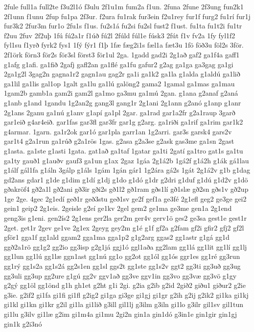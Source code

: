 {2fule
full1a
full2te
f3u2l1ó
f3ulu
2f1u1m
fum2a
f1un.
2funa
2fune
2f3ung
fun2k1
2f1unn
f1unu
2fup
fu1pa
2f3ur.
f2ura
fu1rak
fur3ein
f2u1rey
fur1f
furg2
fu1rí
fur1j
fur3k2
2fur3m
fur1o
2fu1s
f1us.
fu2s1á
fu2si
fu2sl
fust2
f1ust.
fu1ta
fu1t2i
fu1tr
f2uu
2fuv
2f2uþ
1fú
fú2a1r
f1úð
fú2l
2fúld
fúl1e
fúsk3
2fút
f1v
fv2a
1fy
fyl1f2
fyl1su
f1yrð
fyrk2
fys1
1fý
fýr1
f1þ
1fæ
fæg2i1s
fæl1a
fæt3u
1fö
föð3u
föl2s
3för.
2f1örk
förn3
för2s
för3sl
först3
för1ul
2ga.
1gadd
gad2i
2g1að
gaf2
ga1f4a
gaff1
g1afg
g1afi.
ga1fið
2gafj
gafl2an
ga1flé
ga1fu
gafur2
g2ag
ga1ga
ga3gag
ga1gi
2ga1g2l
3gag2n
gagna1r2
gagn1au
gag2r
ga1i
ga1k2
ga1la
g1alda
g1aldú
ga1lið
ga1lil
ga1lis
gal1op
1galt
ga1lu
ga1lú
galöng2
gama2
1gamal
ga1mas
ga1mau
1gam2b
gamb1a
gam2i
gam2l
ga1mo
ga3mu
ga1mú
2gan.
g1ana
g2anaf
g2aná
g1anb
g1and
1gandu
1g2an2g
gang3l
gang1r
2g1ani
2g1ann
g2anó
g1anp
g1anr
2g1ans
2ganu
ga1nú
g1anv
g1apí
ga1pl
2gar.
ga1rad
gar1a2fr
g2a1raup
3garð
gar1eið
g4ar4eið.
gar1fas
gar3fl
gar3fr
gar1g
g2arg.
ga1riði
ga1rif
ga1rim
gar1k2
g4armar.
1garn.
ga1r2ok
gar1ó
gar1pla
garr1an
1g2arri.
gar3s
garsk4
gars2v
gar1t4
g2a1run
ga1rúð
g2a1rös
1gas.
g2asa
g2a3se
g2ask
gas3me
ga1sn
2gast
g1asta.
ga1ste
g1asti
1gata.
gat1að
ga1taf
1gatar
ga1ti
2gatí
ga1tro
gat1s
ga1tu
ga1ty
gauð1
g1auðv
gauf3
ga1un
g1ax
2gaz
1gáa
2g1á2b
1gá2f
g1á2h
g1ák
gá1lau
g1álf
gál1fa
g1áln
3gálp
g1áls
1gám
1gán
gár1
1g2ára
gá2s
1gát
2g1á2v
g1b
g1dag
gd2ans
gdar1
g1de
g1dim
g1dí
g1dj
g1do
g1dó
g1dr
g2dri
g1duf
g1dú
g1d2v
g1dö
gðakröf4
gð2a1l
gð2ani
gð3ir
gði2s
gð1l2
gð1ram
gðs1lí
gð1slæ
gð2sn
gðs1v
gð2up
1ge
2ge.
4gec
2g1edí
geð1r
geð3stu
geð1sv
ge2f
gef1a
ge3fé
2g1efl
geg2
ge3ge
gei2
gein1
geip2
2g1eis.
2geisle
g2eí
ge1kv
2gel
gem2
ge1ma
ge3me
gen1a
2g1end
geng3is
g1eni.
gen2ís2
2g1ens
ger2la
ger2m
ger4v
gerv1ö
ges2
ge3sa
gest1e
gest1r
2get.
get1r
2gev
ge1ve
2g1ex
2geyg
gey2m
g1é
g1f
gf2a
g2fam
gf2i
gfir2
gfj2
gf2l
gför1
gga1f
gg1ald
ggam2
gga1ma
gga1p2
g1g2arg
ggas2
gg1astr
g1gá
gg1d
ggð2a1rö
gg1g2
gg2io
gg3isp
g2g1já
ggj1ó
ggl1aða
gg2lam
gg1lá
gg1lit
gg1lí
gg1lj
gg1lun
gg1lú
gg1læ
ggn1ast
gg1nú
gg1o
gg2ot
gg1ól
gg1ós
ggr1es
gg1ré
gg3run
gg1rý
gg1s2a
gg1s2á
gg2s1en
gg1sl
ggs2t
gg1ste
gg1s2v
ggt2
gg3ti
gg3uð
gg3ug
gg3uli
gg3up
gg2ure
g1gú
gg2v
ggv1að
gg3ve
ggv1in
gg3vo
gg3væ
gg3vö
g1gy
g2gý
gg1öl
gg1önd
g1h
gh1et
g2ht
g1i
2gi.
g2ia
g2ib
g2id
2gið2
giðu1
giður2
g2ie
g3ie.
g2if2
gi1fa
gi1fi
gi1fl
g2ig2
gi1ga
gi3ge
gi1gj
gi1gr
g2ih
g2ij
g2ik2
gi1ka
gi1kj
gi1kl
gi1kn
gi1kr
g2il
gi1la
gi1lið
g3ill
gil1lj
g3ilm
g3iln
gi1lo
g3ilr
gil1sv
gil1tun
gi1lu
g3ilv
gi1læ
g2im
gi1m4a
gi1mu
2gi2n
gin1a
gin1dó
g3in1e
gin1gir
gin1gj
gin1k
g2i3nó
}
